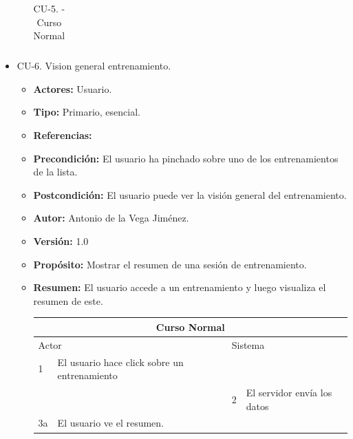 \begin{itemize}
\begin{itemize}
\begin{table}[H]
\begin{tabularx}{\textwidth}{|l|X|l|X|}
      \end{tabularx}
      \caption{CU-5. - Curso Normal}
      \label{table-8}
    \end{table}
  \end{itemize}
  \item CU-6. Vision general entrenamiento.
  \begin{itemize}
    \item \textbf{Actores:} Usuario.
    \item \textbf{Tipo:} Primario, esencial.
    \item \textbf{Referencias:}
    \item \textbf{Precondición:} El usuario ha pinchado sobre uno de los entrenamientos de la lista.
    \item \textbf{Postcondición:} El usuario puede ver la visión general del entrenamiento.
    \item \textbf{Autor:} Antonio de la Vega Jiménez.
    \item \textbf{Versión:} 1.0
    \item \textbf{Propósito:} Mostrar el resumen de una sesión de entrenamiento.
    \item \textbf{Resumen:} El usuario accede a un entrenamiento y luego visualiza el resumen de este.
    \begin{table}[H]
      \centering
      \begin{tabularx}{\textwidth}{|l|X|l|X|}
        \hline
        \multicolumn{4}{|c|}{\cellcolor[HTML]{C0C0C0}Curso Normal}                                                 \\ \hline
        \multicolumn{2}{|l|}{\cellcolor[HTML]{EFEFEF}Actor} & \multicolumn{2}{l|}{\cellcolor[HTML]{EFEFEF}Sistema} \\ \hline
        1                         & El usuario hace click sobre un entrenamiento                       &                            &                         \\ \hline
                                  &                         & 2                          & El servidor envía los datos                     \\ \hline
        3a                         & El usuario ve el resumen.      &                          &                        \\ \hline
                                  

\end{tabularx}
\end{table}
\end{itemize}
\end{itemize}
